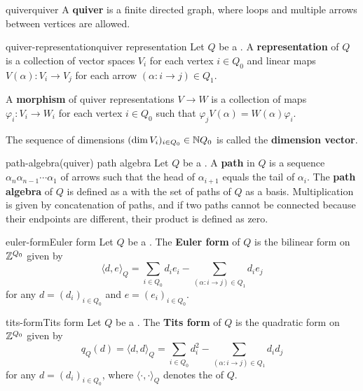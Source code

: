 \begin{topic}{quiver}{quiver}
    A \textbf{quiver} is a finite directed graph, where loops and multiple arrows between vertices are allowed.    
\end{topic}

\begin{topic}{quiver-representation}{quiver representation}
    Let $Q$ be a . A \textbf{representation} of $Q$ is a collection of vector spaces $V_i$ for each vertex $i \in Q_0$ and linear maps $V(\alpha) : V_i \to V_j$ for each arrow $(\alpha : i \to j) \in Q_1$.
    
    A \textbf{morphism} of quiver representations $V \to W$ is a collection of maps $\varphi_i : V_i \to W_i$ for each vertex $i \in Q_0$ such that $\varphi_j V(\alpha) = W(\alpha) \varphi_i$.
    
    The sequence of dimensions $(\dim V_i)_{i \in Q_0} \in \mathbb{N} Q_0$ is called the \textbf{dimension vector}.
\end{topic}

\begin{topic}{path-algebra}{(quiver) path algebra}
    Let $Q$ be a . A \textbf{path} in $Q$ is a sequence $\alpha_n \alpha_{n - 1} \cdots \alpha_1$ of arrows such that the head of $\alpha_{i + 1}$ equals the tail of $\alpha_{i}$. The \textbf{path algebra} of $Q$ is defined as a  with the set of paths of $Q$ as a basis. Multiplication is given by concatenation of paths, and if two paths cannot be connected because their endpoints are different, their product is defined as zero.
\end{topic}

\begin{topic}{euler-form}{Euler form}
    Let $Q$ be a . The \textbf{Euler form} of $Q$ is the bilinear form on $\mathbb{Z}^{Q_0}$ given by
    \[ \langle d, e \rangle_Q = \sum_{i \in Q_0} d_i e_i - \sum_{(\alpha : i \to j) \in Q_1} d_i e_j \]
    for any $d = (d_i)_{i \in Q_0}$ and $e = (e_i)_{i \in Q_0}$.
\end{topic}

\begin{topic}{tits-form}{Tits form}
    Let $Q$ be a . The \textbf{Tits form} of $Q$ is the quadratic form on $\mathbb{Z}^{Q_0}$ given by
    \[ q_Q(d) = \langle d, d \rangle_Q = \sum_{i \in Q_0} d_i^2 - \sum_{(\alpha : i \to j) \in Q_1} d_i d_j \]
    for any $d = (d_i)_{i \in Q_0}$, where $\langle \cdot, \cdot \rangle_Q$ denotes the  of $Q$.
\end{topic}
